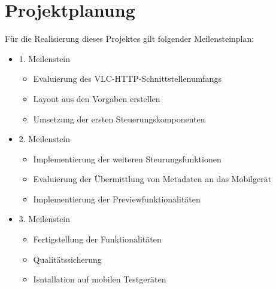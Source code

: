 \documentclass[a4paper]{article}
\begin{document}
\section*{Projektplanung}
Für die Realisierung dieses Projektes gilt folgender Meilensteinplan:
\begin{itemize}
\item 1. Meilenstein
\begin{itemize}
\item Evaluierung des VLC-HTTP-Schnittstellenumfangs
\item Layout aus den Vorgaben erstellen
\item Umsetzung der ersten Steuerungskomponenten
\end{itemize}
\item 2. Meilenstein
\begin{itemize}
\item Implementierung der weiteren Steurungsfunktionen
\item Evaluierung der Übermittlung von Metadaten an das Mobilgerät
\item Implementierung der Previewfunktionalitäten
\end{itemize}
\item 3. Meilenstein
\begin{itemize}
\item Fertigstellung der Funktionalitäten
\item Qualitätssicherung
\item Isntallation auf mobilen Testgeräten
\end{itemize}
\end{itemize}
\newpage
\printbibliography
\end{document}
